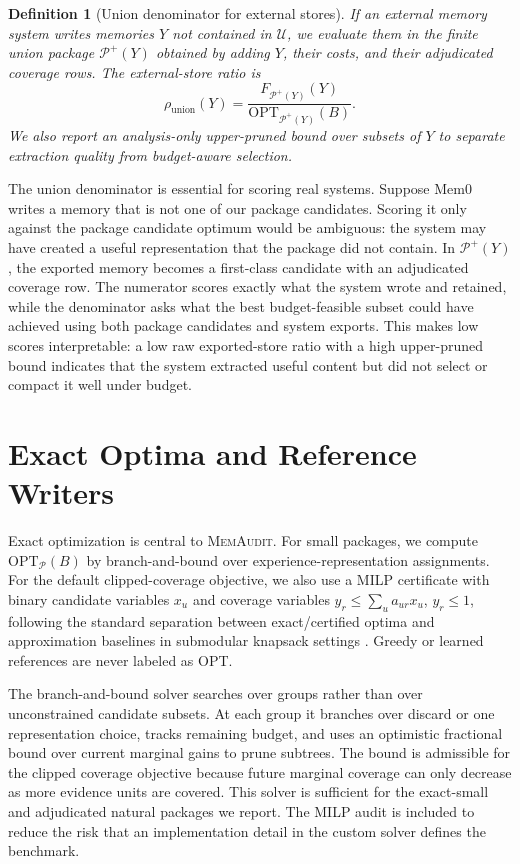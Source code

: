 \documentclass{article}
\newtheorem{definition}[theorem]{Definition}
\theoremstyle{remark}
\theoremstyle{plain}
\newcommand{\method}{\textsc{MemAudit}}
\newcommand{\budget}{B}
\newcommand{\ground}{\mathcal{U}}
\newcommand{\package}{\mathcal{P}}
\newcommand{\opt}{\mathrm{OPT}}
\begin{document}
\begin{definition}[Union denominator for external stores]\label{def:union}
If an external memory system writes memories $Y$ not contained in $\ground$, we evaluate them in the finite union package $\package^+(Y)$ obtained by adding $Y$, their costs, and their adjudicated coverage rows. The external-store ratio is
\[
\rho_{\mathrm{union}}(Y)=
\frac{F_{\package^+(Y)}(Y)}{\opt_{\package^+(Y)}(\budget)}.
\]
We also report an analysis-only upper-pruned bound over subsets of $Y$ to separate extraction quality from budget-aware selection.
\end{definition}

The union denominator is essential for scoring real systems. Suppose Mem0 writes a memory that is not one of our package candidates. Scoring it only against the package candidate optimum would be ambiguous: the system may have created a useful representation that the package did not contain. In $\package^+(Y)$, the exported memory becomes a first-class candidate with an adjudicated coverage row. The numerator scores exactly what the system wrote and retained, while the denominator asks what the best budget-feasible subset could have achieved using both package candidates and system exports. This makes low scores interpretable: a low raw exported-store ratio with a high upper-pruned bound indicates that the system extracted useful content but did not select or compact it well under budget.

\section{Exact Optima and Reference Writers}\label{sec:oracles}

Exact optimization is central to \method. For small packages, we compute $\opt_{\package}(\budget)$ by branch-and-bound over experience-representation assignments. For the default clipped-coverage objective, we also use a MILP certificate with binary candidate variables $x_u$ and coverage variables $y_r\leq\sum_u a_{ur}x_u$, $y_r\leq1$, following the standard separation between exact/certified optima and approximation baselines in submodular knapsack settings \cite{sviridenko2004,huang2017knapsack}. Greedy or learned references are never labeled as OPT.

The branch-and-bound solver searches over groups rather than over unconstrained candidate subsets. At each group it branches over discard or one representation choice, tracks remaining budget, and uses an optimistic fractional bound over current marginal gains to prune subtrees. The bound is admissible for the clipped coverage objective because future marginal coverage can only decrease as more evidence units are covered. This solver is sufficient for the exact-small and adjudicated natural packages we report. The MILP audit is included to reduce the risk that an implementation detail in the custom solver defines the benchmark.
\end{document}
